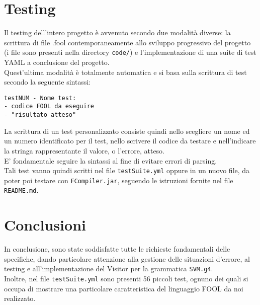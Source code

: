 \documentclass[a4paper]{article}   %
\begin{document}
\section{Testing}
Il testing dell'intero progetto è avvenuto secondo due modalità diverse: la scrittura di file .fool contemporaneamente allo sviluppo progressivo del progetto (i file sono presenti nella directory \lstinline|code/|) e l'implementazione di una suite di test YAML a conclusione del progetto.\\
Quest'ultima modalità è totalmente automatica e si basa sulla scrittura di test secondo la seguente sintassi:
\begin{lstlisting}[basicstyle=\footnotesize\ttfamily]
testNUM - Nome test:
- codice FOOL da eseguire
- "risultato atteso"
\end{lstlisting}
La scrittura di un test personalizzato consiste quindi nello scegliere un nome ed un numero identificato per il test, nello scrivere il codice da testare e nell'indicare la stringa rappresentante il valore, o l'errore, atteso.\\
E' fondamentale seguire la sintassi al fine di evitare errori di parsing.\\
Tali test vanno quindi scritti nel file \lstinline|testSuite.yml| oppure in un nuovo file, da poter poi testare con \lstinline|FCompiler.jar|, seguendo le istruzioni fornite nel file \lstinline|README.md|.
\section{Conclusioni}
In conclusione, sono state soddisfatte tutte le richieste fondamentali delle specifiche, dando particolare attenzione alla gestione delle situazioni d'errore, al testing e all'implementazione del Visitor per la grammatica \lstinline|SVM.g4|.\\
Inoltre, nel file \lstinline|testSuite.yml| sono presenti 56 piccoli test, ognuno dei quali si occupa di mostrare una particolare caratteristica del linguaggio FOOL da noi realizzato.

\end{document}
